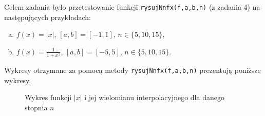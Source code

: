 \documentclass[]{article}
\begin{document}
	Celem zadania było przetestowanie funkcji \texttt{rysujNnfx(f,a,b,n)} (z zadania 4) na następujących przykładach:
	\begin{enumerate}[(a)]
		\item $f(x) = |x|$, $[a, b] = [-1,1]$, $n \in \{5,10,15\}$,
		\item $f(x) = \frac{1}{1+x^2}$, $[a, b] = [-5,5]$, $n \in \{5,10,15\}$.
	\end{enumerate}
Wykresy otrzymane za pomocą metody \texttt{rysujNnfx(f,a,b,n)} prezentują poniższe wykresy.
\begin{figure}[h]
	\centering
	 \hfill
	 \hfill
	 \hfill
	 \hfill
	\caption*{Wykres funkcji $|x|$ i jej wielomianu interpolacyjnego dla danego stopnia $n$}
	\label{fig:3}
\end{figure}		
\end{document}

